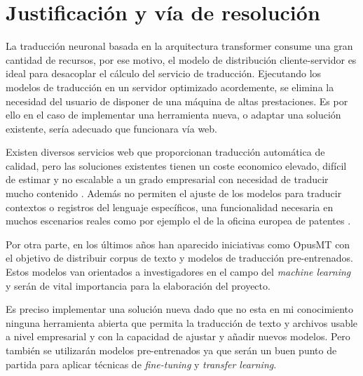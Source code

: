 \section{Justificación y vía de resolución}
La traducción neuronal basada en la arquitectura transformer consume una gran cantidad de recursos,
por ese motivo, el modelo de distribución cliente-servidor es ideal para desacoplar el cálculo del
servicio de traducción. Ejecutando los modelos de traducción en un servidor optimizado acordemente,
se elimina la necesidad del usuario de disponer de una máquina de altas prestaciones. Es por ello
en el caso de implementar una herramienta nueva, o adaptar una solución existente, sería adecuado
que funcionara vía web.

Existen diversos servicios web que proporcionan traducción automática de calidad, pero las soluciones
existentes tienen un coste economico elevado, difícil de estimar y no escalable a un grado
empresarial con necesidad de traducir mucho contenido \cite{GoogleTranslatePricing,AWSTranslatePricing,MicrosoftTranslatePricing}.
Además no permiten el ajuste de los modelos para traducir contextos o registros del lenguaje
específicos, una funcionalidad necesaria en muchos escenarios reales como por ejemplo el de la oficina
europea de patentes \cite{PatentOffice2020Jul}.

Por otra parte, en los últimos años han aparecido iniciativas como OpusMT
\cite{HelsinkiTiedemannThottingal2020} con el objetivo de distribuir corpus de texto y modelos de
traducción pre-entrenados. Estos modelos van orientados a investigadores en el campo del
\textit{machine learning} y serán de vital importancia para la elaboración del proyecto.

Es preciso implementar una solución nueva dado que no esta en mi conocimiento ninguna
herramienta abierta que permita la traducción de texto y archivos usable a nivel empresarial
y con la capacidad de ajustar y añadir nuevos modelos. Pero también se utilizarán modelos
pre-entrenados ya que serán un buen punto de partida para aplicar técnicas de
\textit{fine-tuning} y \textit{transfer learning}.

